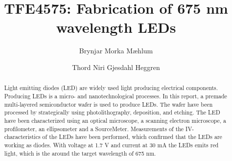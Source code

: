 \documentclass[5p,sort&compress]{elsarticle}
\begin{document}
\begin{frontmatter}

  \title{TFE4575: Fabrication of 675 nm wavelength LEDs}

  \author[fysikk]{Brynjar Morka Mæhlum}
  \author[fysikk]{Thord Niri Gjesdahl Heggren}
  \address[fysikk]{Department of Physics, Norwegian University of Science and Technology, 7491 Trondheim, Norway.}

  \begin{abstract}

    \noindent Light emitting diodes (LED) are widely used light producing electrical components.
    Producing LEDs is a micro- and nanotechnological processes.
    In this report, a premade multi-layered semiconductor wafer is used to produce LEDs.
    The wafer have been processed by strategically using photolithography, deposition, and etching.
    The LED have been characterized using an optical microscope, a scanning electron microscope, a profilometer, an ellipsometer and a SourceMeter.
    Measurements of the IV-characteristics of the LEDs have been performed, which confirmed that the LEDs are working as diodes.
    With voltage at 1.7 V and current at 30 mA the LEDs emits red light, which is the around the target wavelength of 675 nm.

  \end{abstract}
 

\end{frontmatter}
\end{document}
